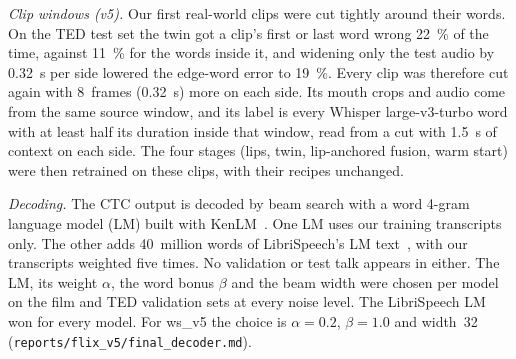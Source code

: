 \textit{Clip windows (v5).} Our first real-world clips were cut tightly around their words. On the
TED test set the twin got a clip's first or last word wrong 22~\% of the time, against 11~\% for
the words inside it, and widening only the test audio by 0.32~s per side lowered the edge-word
error to 19~\%. Every clip was therefore cut again with 8~frames (0.32~s) more on each side.
Its mouth crops and audio come from the same source window, and its label is every Whisper
large-v3-turbo word with at least half its duration inside that window, read from a cut with
1.5~s of context on each side. The four stages (lips, twin, lip-anchored fusion, warm start) were
then retrained on these clips, with their recipes unchanged.

\textit{Decoding.} The CTC output is decoded by beam search with a word 4-gram language model
(LM) built with KenLM~\cite{heafield2011}. One LM uses our training transcripts only. The other adds 40~million
words of LibriSpeech's LM text~\cite{panayotov2015}, with our transcripts weighted five times. No
validation or test talk appears in either. The LM, its weight $\alpha$, the word bonus $\beta$ and
the beam width were chosen per model on the film and TED validation sets at every noise level.
The LibriSpeech LM won for every model. For ws\_v5 the choice is $\alpha = 0.2$, $\beta = 1.0$
and width~32 (\texttt{reports/\allowbreak{}flix\_\allowbreak{}v5/\allowbreak{}final\_\allowbreak{}decoder.md}).
